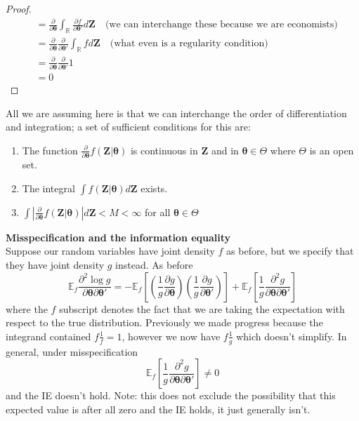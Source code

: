 \documentclass[DIV=14,titlepage=false]{scrreprt}
\begin{document}
\begin{proof}
\begin{align*}
    &= \frac{\partial}{\partial \boldsymbol{\theta}}\int_{\mathbb{R}}\frac{\partial f}{\partial \boldsymbol{\theta}'} d\boldsymbol{Z} \quad \text{(we can interchange these because we are economists)}\\
    &= \frac{\partial}{\partial \boldsymbol{\theta}}\frac{\partial}{\partial \boldsymbol{\theta}'}\int_{\mathbb{R}} f d\boldsymbol{Z} \quad \text{(what even is a regularity condition)}\\
    &= \frac{\partial}{\partial \boldsymbol{\theta}}\frac{\partial}{\partial \boldsymbol{\theta}'} 1\\
    &= 0
\end{align*}
\end{proof}

\begin{note}
    All we are assuming here is that we can interchange the order of differentiation and integration; a set of sufficient conditions for this are:
    \begin{enumerate}
        \item The function $\frac{\partial}{\partial \boldsymbol{\theta}}f(\boldsymbol{Z}|\boldsymbol{\theta})$ is continuous in $\boldsymbol{Z}$ and in $\boldsymbol{\theta} \in \Theta$ where $\Theta$ is an open set.
        \item The integral $\int f(\boldsymbol{Z}|\boldsymbol{\theta})d\boldsymbol{Z}$ exists.
        \item $\int\left|\frac{\partial}{\partial \boldsymbol{\theta}}f(\boldsymbol{Z}|\boldsymbol{\theta})\right|d\boldsymbol{Z}<M<\infty$ for all $\boldsymbol{\theta} \in \Theta$
    \end{enumerate}
\end{note}
\textbf{Misspecification and the information equality}\\
Suppose our random variables have joint density $f$ as before, but we specify that they have joint density $g$ instead. As before \[ \mathbb{E}_f \frac{\partial^2 \log g}{\partial \boldsymbol{\theta} \partial \boldsymbol{\theta}'} = -\mathbb{E}_f\left[\left(\frac{1}{g}\frac{\partial g}{\partial \boldsymbol{\theta}}\right)\left(\frac{1}{g}\frac{\partial g}{\partial \boldsymbol{\theta}'}\right)\right] + \mathbb{E}_f\left[\frac{1}{g}\frac{\partial^2g}{\partial \boldsymbol{\theta} \partial \boldsymbol{\theta}'}\right] \] where the $f$ subscript denotes the fact that we are taking the expectation with respect to the true distribution. Previously we made progress because the integrand contained $f\tfrac{1}{f}=1$, however we now have $f\tfrac{1}{g}$ which doesn't simplify. In general, under misspecification \[\mathbb{E}_f\left[\frac{1}{g}\frac{\partial^2g}{\partial \boldsymbol{\theta} \partial \boldsymbol{\theta}'}\right] \not = 0\] and the IE doesn't hold. Note: this does not exclude the possibility that this expected value is after all zero and the IE holds, it just generally isn't.
\end{document}

